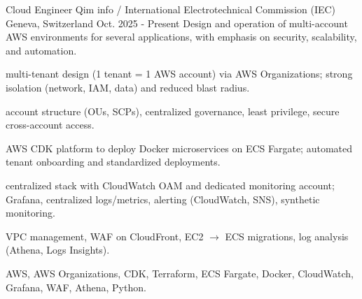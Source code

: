 

\begin{cventries}

  \cventrywithintro
    {Cloud Engineer} %
    {Qim info / International Electrotechnical Commission (IEC)} %
    {Geneva, Switzerland} %
    {Oct. 2025 - Present} %
    {Design and operation of multi-account AWS environments for several applications, with emphasis on security, scalability, and automation.} %
    {
      \begin{cvitemsafterintro}
        \item { multi-tenant design (1 tenant = 1 AWS account) via AWS Organizations; strong isolation (network, IAM, data) and reduced blast radius.}
        \item { account structure (OUs, SCPs), centralized governance, least privilege, secure cross-account access.}
        \item { AWS CDK platform to deploy Docker microservices on ECS Fargate; automated tenant onboarding and standardized deployments.}
        \item { centralized stack with CloudWatch OAM and dedicated monitoring account; Grafana, centralized logs/metrics, alerting (CloudWatch, SNS), synthetic monitoring.}
        \item { VPC management, WAF on CloudFront, EC2 $\rightarrow$ ECS migrations, log analysis (Athena, Logs Insights).}
      \end{cvitemsafterintro}
    }
    {AWS, AWS Organizations, CDK, Terraform, ECS Fargate, Docker, CloudWatch, Grafana, WAF, Athena, Python.}


\end{cventries}

